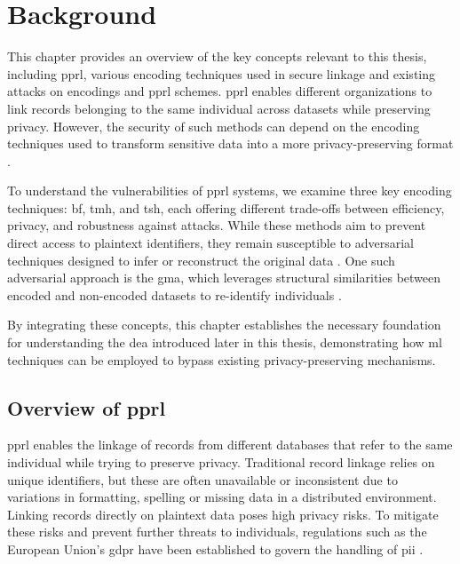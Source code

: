 \chapter{Background}  \label{sec:background}

This chapter provides an overview of the key concepts relevant to this thesis, including \ac{pprl}, various encoding techniques used in secure linkage and existing attacks on encodings and \ac{pprl} schemes.
\ac{pprl} enables different organizations to link records belonging to the same individual across datasets while preserving privacy.
However, the security of such methods can depend on the encoding techniques used to transform sensitive data into a more privacy-preserving format \cite{vidanage2020graph}.

To understand the vulnerabilities of \ac{pprl} systems, we examine three key encoding techniques: \ac{bf}, \ac{tmh}, and \ac{tsh}, each offering different trade-offs between efficiency, privacy, and robustness against attacks.
While these methods aim to prevent direct access to plaintext identifiers, they remain susceptible to adversarial techniques designed to infer or reconstruct the original data \cite{vidanage2020graph,schaefer2024}.
One such adversarial approach is the \ac{gma}, which leverages structural similarities between encoded and non-encoded datasets to re-identify individuals \cite{schaefer2024,vidanage2020graph}.

By integrating these concepts, this chapter establishes the necessary foundation for understanding the \ac{dea} introduced later in this thesis, demonstrating how \ac{ml} techniques can be employed to bypass existing privacy-preserving mechanisms.

\section{Overview of \ac{pprl} }\label{sec:pprl_overview}

\ac{pprl} enables the linkage of records from different databases that refer to the same individual while trying to preserve privacy.
Traditional record linkage relies on unique identifiers, but these are often unavailable or inconsistent due to variations in formatting, spelling or missing data in a distributed environment.
Linking records directly on plaintext data poses high privacy risks.
To mitigate these risks and prevent further threats to individuals, regulations such as the European Union's \ac{gdpr} have been established to govern the handling of \ac{pii} \cite{schaefer2024,vidanage2020graph}.

